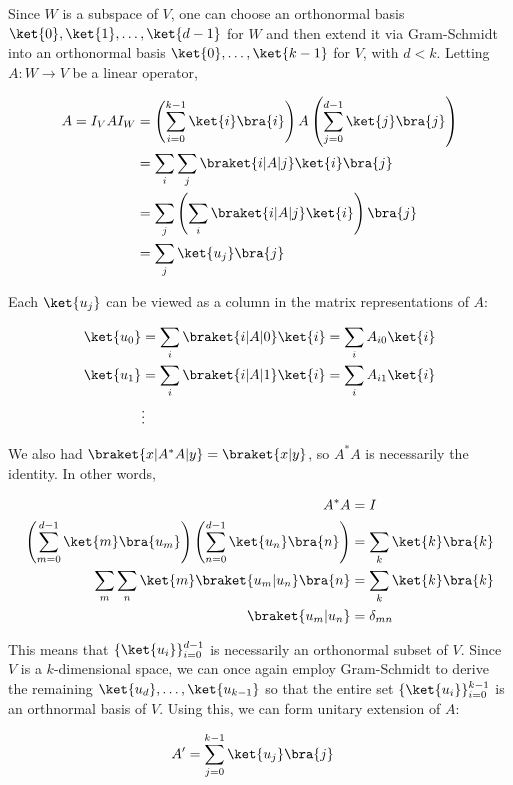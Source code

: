 \par Since $W$ is a subspace of $V$, one can choose an orthonormal basis
$\ket{0}, \ket{1}, \ldots, \ket{d-1}$ for $W$ and then extend it via
Gram-Schmidt into an orthonormal basis $\ket{0}, \ldots, \ket{k-1}$ for $V$,
with $d < k$. Letting $A : W \rightarrow V$ be a linear operator,

\begin{align}
A = I_V A I_W &= \left( \sum_{i = 0}^{k - 1}{\ket{i} \bra{i}} \right) A \left(
\sum_{j = 0}^{d - 1}{\ket{j} \bra{j}} \right) \\
&= \sum_i{\sum_j{\braket{i|A|j} \ket{i} \bra{j}}} \\
&= \sum_j{\left( \sum_i{\braket{i|A|j} \ket{i}} \right) \bra{j}} \\
&= \sum_j{\ket{u_j} \bra{j}}
\end{align}

\par Each $\ket{u_j}$ can be viewed as a column in the matrix representations of
$A$:

\begin{align*}
\ket{u_0} &= \sum_i{\braket{i|A|0} \ket{i}} = \sum_i{A_{i0} \ket{i}} \\
\ket{u_1} &= \sum_i{\braket{i|A|1} \ket{i}} = \sum_i{A_{i1} \ket{i}} \\
&\vdots
\end{align*}

\par We also had $\braket{x|A^* A|y} = \braket{x|y}$, so $A^* A$ is necessarily
the identity. In other words,

\begin{align}
A^* A &= I \\
\left( \sum_{m = 0}^{d - 1}{\ket{m} \bra{u_m}} \right) \left( \sum_{n = 0}^{d -
1}{\ket{u_n} \bra{n}} \right) &= \sum_k{\ket{k} \bra{k}} \\
\sum_m{\sum_n{\ket{m} \braket{u_m|u_n} \bra{n}}} &= \sum_k{\ket{k} \bra{k}} \\
\braket{u_m|u_n} &= \delta_{mn}
\end{align}

This means that $\{\ket{u_i}\}_{i = 0}^{d - 1}$ is necessarily an orthonormal
subset of $V$. Since $V$ is a $k$-dimensional space, we can once again employ
Gram-Schmidt to derive the remaining $\ket{u_d}, \ldots, \ket{u_{k-1}}$ so that
the entire set $\{\ket{u_i}\}_{i = 0}^{k - 1}$ is an orthnormal basis of $V$.
Using this, we can form unitary extension of $A$:

\begin{align}
A' &= \sum_{j = 0}^{k - 1}{\ket{u_j} \bra{j}}
\end{align}
